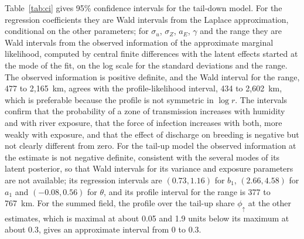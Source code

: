 \documentclass[11pt,a4paper]{article}
\begin{document}
Table~\ref{tab:ci} gives 95\% confidence intervals for the tail-down model. For the regression coefficients they are Wald intervals from the Laplace approximation, conditional on the other parameters; for $\sigma_u$, $\sigma_Z$, $a_E$, $\gamma$ and the range they are Wald intervals from the observed information of the approximate marginal likelihood, computed by central finite differences with the latent effects started at the mode of the fit, on the log scale for the standard deviations and the range. The observed information is positive definite, and the Wald interval for the range, 477 to 2{,}165~km, agrees with the profile-likelihood interval, 434 to 2{,}602~km, which is preferable because the profile is not symmetric in $\log r$. The intervals confirm that the probability of a zone of transmission increases with humidity and with river exposure, that the force of infection increases with both, more weakly with exposure, and that the effect of discharge on breeding is negative but not clearly different from zero. For the tail-up model the observed information at the estimate is not negative definite, consistent with the several modes of its latent posterior, so that Wald intervals for its variance and exposure parameters are not available; its regression intervals are $(0.73, 1.16)$ for $b_1$, $(2.66, 4.58)$ for $a_1$ and $(-0.08, 0.56)$ for $\theta$, and its profile interval for the range is 377 to 767~km. For the summed field, the profile over the tail-up share $\phi_\uparrow$ at the other estimates, which is maximal at about 0.05 and 1.9 units below its maximum at about 0.3, gives an approximate interval from 0 to 0.3.
\end{document}
